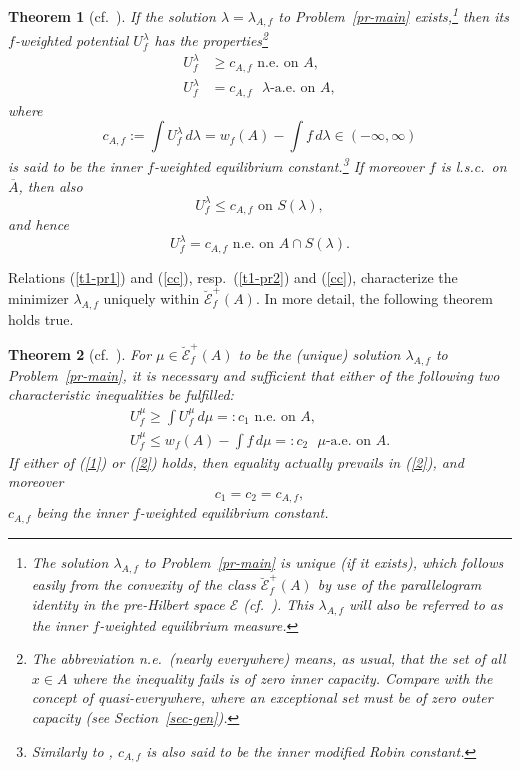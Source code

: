 \documentclass[12pt,a4paper,reqno]{amsart} %
\theoremstyle{lause}
\theoremstyle{maaritelma}
\theoremstyle{lause}
\newtheorem{theorem}{Theorem}[section]
\theoremstyle{maaritelma}
\numberwithin{equation}{section}
\begin{document}
\begin{theorem}[{\rm cf.\ \cite[Theorems~1, 2]{Z5a}}]\label{th-ch1}
If the solution $\lambda=\lambda_{A,f}$ to Problem~{\rm\ref{pr-main}} exists,\footnote{The solution $\lambda_{A,f}$ to Problem~\ref{pr-main} is {\it unique} (if it exists), which follows easily from the convexity of the class $\breve{\mathcal E}^+_f(A)$ by use of the parallelogram identity in the pre-Hil\-bert space $\mathcal E$ (cf.\ \cite[Lemma~6]{Z5a}). This $\lambda_{A,f}$ will also be referred to as {\it the inner $f$-weighted equilibrium measure}.} then its $f$-wei\-ghted potential $U_f^{\lambda}$ has the properties\footnote{The abbreviation {\it n.e.}\ ({\it nearly everywhere}) means, as usual, that the set of all $x\in A$ where the inequality fails is of zero {\it inner} capacity. Compare with the concept of quasi-everywhere, where an exceptional set must be of zero {\it outer} capacity (see Section~\ref{sec-gen}).}
\begin{align}
  U_f^{\lambda}&\geqslant c_{A,f}\text{ \ n.e.\ on $A$},\label{t1-pr1}\\
  U_f^{\lambda}&=c_{A,f}\text{ \ $\lambda$-a.e.\ on $A$},\label{t1-pr2}
\end{align}
where
\begin{equation}\label{cc}
c_{A,f}:=\int U_f^{\lambda}\,d\lambda=w_f(A)-\int f\,d\lambda\in(-\infty,\infty)
\end{equation}
is said to be the inner $f$-weighted equilibrium constant.\footnote{Similarly to \cite[p.~27]{ST}, $c_{A,f}$ is also said to be  {\it the inner modified Robin constant}.}
If moreover $f$ is l.s.c.\ on $\overline{A}$, then also
\begin{equation*}\label{old}U_f^{\lambda}\leqslant c_{A,f}\text{ \ on $S(\lambda)$},\end{equation*}
and hence
\[U_f^{\lambda}=c_{A,f}\text{ \ n.e.\ on $A\cap S(\lambda)$}.\]
\end{theorem}

Relations (\ref{t1-pr1}) and (\ref{cc}), resp.\ (\ref{t1-pr2}) and (\ref{cc}), characterize the minimizer $\lambda_{A,f}$ uniquely within $\breve{\mathcal E}^+_f(A)$. In more detail, the following theorem holds true.

\begin{theorem}[{\rm cf.\ \cite[Proposition~1]{Z5a}}]\label{th-ch2}For $\mu\in\breve{\mathcal E}^+_f(A)$ to be the {\rm(}unique{\rm)} solution $\lambda_{A,f}$ to Problem~{\rm\ref{pr-main}}, it is necessary and sufficient that either of the following two characteristic inequalities be fulfilled:
\begin{gather}U_f^\mu\geqslant\int U_f^\mu\,d\mu=:c_1\text{ n.e.\ on $A$},\label{1}\\
U_f^\mu\leqslant w_f(A)-\int f\,d\mu=:c_2\text{ \ $\mu$-a.e.\ on $A$.}\label{2}
\end{gather}
If either of {\rm(\ref{1})} or {\rm(\ref{2})} holds, then equality actually prevails in {\rm(\ref{2})}, and moreover
\[c_1=c_2=c_{A,f},\] $c_{A,f}$ being the inner $f$-weighted equilibrium constant.
\end{theorem}
\end{document}
